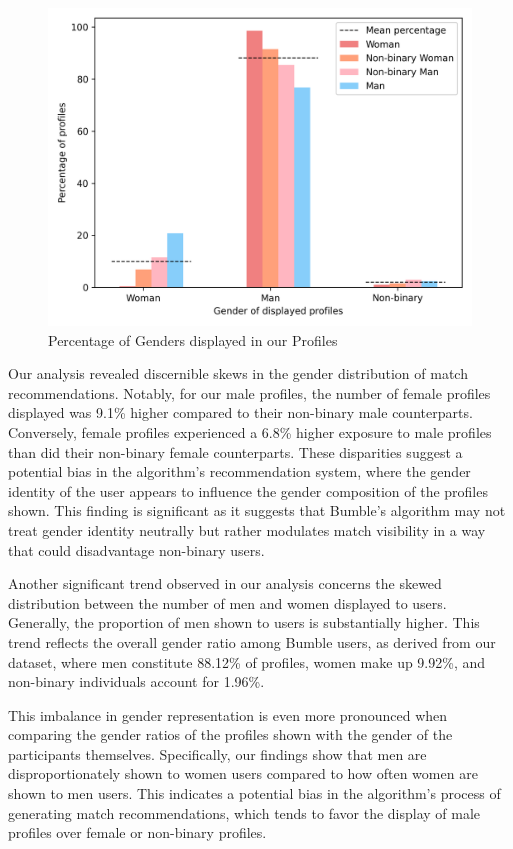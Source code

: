 \begin{figure}[t!]
 \centering
 \includegraphics[scale=0.8]{figures/Analysis and Results/gender_percentage.png}
 \caption{Percentage of Genders displayed in our Profiles}
 \label{fig:img4}
\end{figure}

Our analysis revealed discernible skews in the gender distribution of match recommendations. Notably, for our male profiles, the number of female profiles displayed was 9.1\% higher compared to their non-binary male counterparts. Conversely, female profiles experienced a 6.8\% higher exposure to male profiles than did their non-binary female counterparts. These disparities suggest a potential bias in the algorithm's recommendation system, where the gender identity of the user appears to influence the gender composition of the profiles shown. This finding is significant as it suggests that Bumble’s algorithm may not treat gender identity neutrally but rather modulates match visibility in a way that could disadvantage non-binary users.

Another significant trend observed in our analysis concerns the skewed distribution between the number of men and women displayed to users. Generally, the proportion of men shown to users is substantially higher. This trend reflects the overall gender ratio among Bumble users, as derived from our dataset, where men constitute 88.12\% of profiles, women make up 9.92\%, and non-binary individuals account for 1.96\%.

This imbalance in gender representation is even more pronounced when comparing the gender ratios of the profiles shown with the gender of the participants themselves. Specifically, our findings show that men are disproportionately shown to women users compared to how often women are shown to men users. This indicates a potential bias in the algorithm’s process of generating match recommendations, which tends to favor the display of male profiles over female or non-binary profiles.

